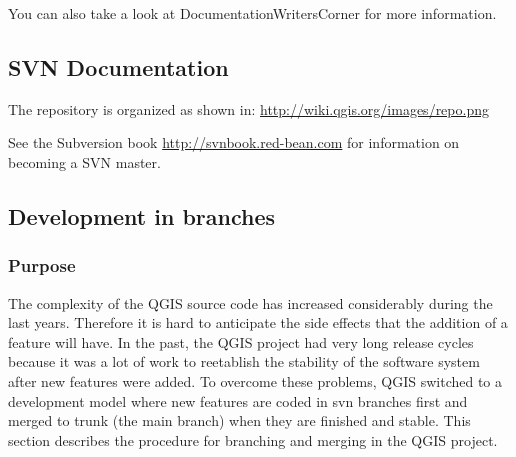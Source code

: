 You can also take a look at DocumentationWritersCorner for more information.

\subsection{SVN Documentation}

The repository is organized as shown in:
\url{http://wiki.qgis.org/images/repo.png}

See the Subversion book \url{http://svnbook.red-bean.com} for information on becoming
a SVN master.

\subsection{Development in branches}
\subsubsection{Purpose}
The complexity of the QGIS source code has increased considerably during the
last years. Therefore it is hard to anticipate the side effects that the
addition of a feature will have. In the past, the QGIS project had very long
release cycles because it was a lot of work to reetablish the stability of the
software system after new features were added. To overcome these problems, QGIS
switched to a development model where new features are coded in svn branches
first and merged to trunk (the main branch) when they are finished and stable.
This section describes the procedure for branching and merging in the QGIS
project.

